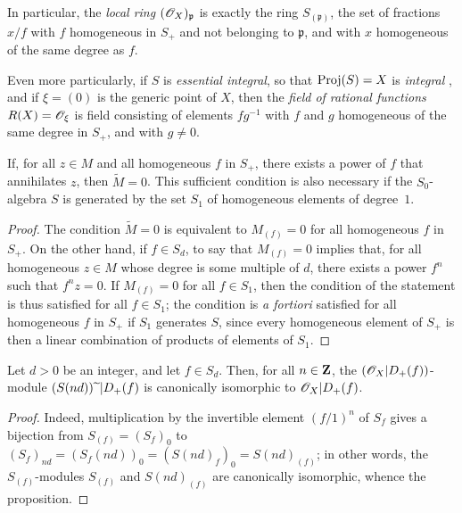 In particular, the \emph{local ring $(\mathscr{O}_X)_\mathfrak{p}$} is exactly the ring $S_{(\mathfrak{p})}$, the set of fractions $x/f$ with $f$ homogeneous in $S_+$ and not belonging to $\mathfrak{p}$, and with $x$ homogeneous of the same degree as $f$.

Even more particularly, if $S$ is \emph{essential integral}, so that $\operatorname{Proj}(S)=X$ is \emph{integral} , and if $\xi=(0)$ is the generic point of $X$, then the \emph{field of rational functions $R(X)=\mathscr{O}_\xi$} is field consisting of elements $fg^{-1}$ with $f$ and $g$ homogeneous of the same degree in $S_+$, and with $g\neq 0$.

\begin{proposition}[2.5.6]
\label{II.2.5.6}
If, for all $z\in M$ and all homogeneous $f$ in $S_+$, there exists a power of $f$ that annihilates $z$, then $\widetilde{M}=0$.
This sufficient condition is also necessary if the $S_0$-algebra $S$ is generated by the set $S_1$ of homogeneous elements of degree~$1$.
\end{proposition}

\begin{proof}
The condition $\widetilde{M}=0$ is equivalent to $M_{(f)}=0$ for all homogeneous $f$ in $S_+$.
On the other hand, if $f\in S_d$, to say that $M_{(f)}=0$ implies that, for all homogeneous $z\in M$ whose degree is some multiple of $d$, there exists a power $f^n$ such that $f^nz=0$.
If $M_{(f)}=0$ for all $f\in S_1$, then the condition of the statement is thus satisfied for all $f\in S_1$;
the condition is \emph{a fortiori} satisfied for all homogeneous $f$ in $S_+$ if $S_1$ generates $S$, since every homogeneous element of $S_+$ is then a linear combination of products of elements of $S_1$.
\end{proof}

\begin{proposition}[2.5.7]
\label{II.2.5.7}
Let $d>0$ be an integer, and let $f\in S_d$.
Then, for all $n\in\mathbf{Z}$, the $(\mathscr{O}_X|D_+(f))$-module $(S(nd)){\,\widetilde{\,}\,}|D_+(f)$ is canonically isomorphic to $\mathscr{O}_X|D_+(f)$.
\end{proposition}

\begin{proof}
Indeed, multiplication by the invertible element $(f/1)^n$ of $S_f$ gives a bijection from $S_{(f)}=(S_f)_0$ to $(S_f)_{nd}=(S_f(nd))_0=(S(nd)_f)_0=S(nd)_{(f)}$;
in other words, the $S_{(f)}$-modules $S_{(f)}$ and $S(nd)_{(f)}$ are canonically isomorphic, whence the proposition.
\end{proof}

